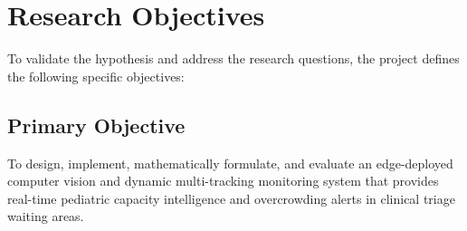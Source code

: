 \section{Research Objectives}

To validate the hypothesis and address the research questions, the project defines the following specific objectives:

\subsection{Primary Objective}
To design, implement, mathematically formulate, and evaluate an edge-deployed computer vision and dynamic multi-tracking monitoring system that provides real-time pediatric capacity intelligence and overcrowding alerts in clinical triage waiting areas.

